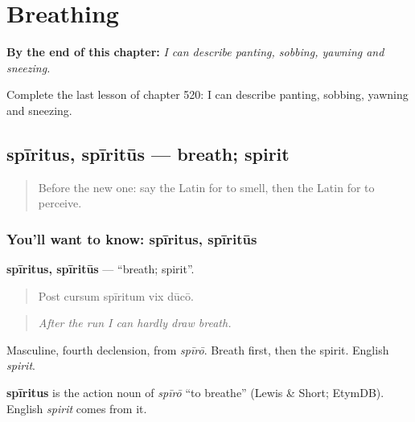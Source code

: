 
\chapter{Breathing}
\label{ch:la-breathing}

\begin{chapteropening}
\textbf{By the end of this chapter:} \emph{I can describe panting, sobbing, yawning and sneezing.}

Complete the last lesson of chapter 520: I can describe panting, sobbing, yawning and sneezing.
\end{chapteropening}

\section[spīritus, spīritūs]{spīritus, spīritūs — breath; spirit}

\label{lesson:LA-C520-spiritus}



\begin{quote}
Before the new one: say the Latin for to smell, then the Latin for to perceive.
\end{quote}

\subsection*{You'll want to know: spīritus, spīritūs}
\textbf{spīritus, spīritūs} — \textquotedblleft{}breath; spirit\textquotedblright{}.

\begin{quote}
Post cursum spīritum vix dūcō.
\end{quote}

\begin{quote}
\emph{After the run I can hardly draw breath.}
\end{quote}

Masculine, fourth declension, from \emph{spīrō}. Breath first, then the spirit. English \emph{spirit}.

\begin{cousinweb}
\textbf{spīritus} is the action noun of \emph{spīrō} \textquotedblleft{}to breathe\textquotedblright{} (Lewis \& Short; EtymDB). English \emph{spirit} comes from it.
\end{cousinweb}

